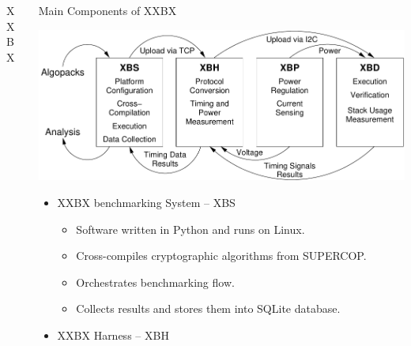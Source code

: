 \documentclass[xcolor=pdftex,dvipsnames,table,final]{beamer}
\begin{document}
\begin{frame}[fragile]{}
\begin{columns}[t, totalwidth=\textwidth]
\begin{column}{.31\linewidth}
\begin{block}{XXBX}
\begin{center}
        \end{center} 
      \end{block}
    \end{column}
\begin{column}{.675\linewidth}
   \begin{columns}%
    \begin{column}{.473\linewidth}
   
      
      \vspace{-0.15ex}
      \begin{block}{Main Components of XXBX}
        \begin{center}
          \includegraphics[scale=1.3]{../figures/xxbx_block}
        \end{center} 
        \begin{itemize}
          \item XXBX benchmarking System -- XBS 
          \begin{itemize}
            \item Software written in Python and runs on Linux.
            \item Cross-compiles cryptographic algorithms from SUPERCOP.
            \item Orchestrates benchmarking flow.
            \item Collects results and stores them into SQLite database.
          \end{itemize}
          \item XXBX Harness -- XBH 
          \begin{itemize}

\end{itemize}
\end{itemize}
\end{block}
\end{column}
\end{columns}
\end{column}
\end{columns}
\end{frame}
\end{document}
